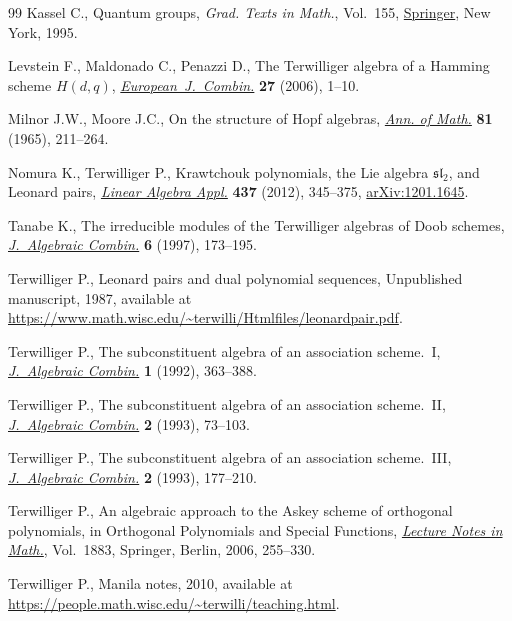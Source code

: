 \begin{thebibliography}{99}
Kassel C., Quantum groups, \textit{Grad. Texts in Math.}, Vol.~155, \href{https://doi.org/10.1007/978-1-4612-0783-2}{Springer},
 New York, 1995.

Levstein F., Maldonado C., Penazzi D., The {T}erwilliger algebra of a {H}amming
 scheme {$H(d,q)$}, \href{https://doi.org/10.1016/j.ejc.2004.08.005}{\textit{European~J.~Combin.}} \textbf{27} (2006), 1--10.

Milnor J.W., Moore J.C., On the structure of {H}opf algebras, \href{https://doi.org/10.2307/1970615}{\textit{Ann. of
 Math.}} \textbf{81} (1965), 211--264.

Nomura K., Terwilliger P., Krawtchouk polynomials, the {L}ie algebra
 {$\mathfrak{sl}_2$}, and {L}eonard pairs, \href{https://doi.org/10.1016/j.laa.2012.02.006}{\textit{Linear Algebra Appl.}}
 \textbf{437} (2012), 345--375, \href{https://arxiv.org/abs/1201.1645}{arXiv:1201.1645}.

Tanabe K., The irreducible modules of the {T}erwilliger algebras of {D}oob
 schemes, \href{https://doi.org/10.1023/A:1008647205853}{\textit{J.~Algebraic Combin.}} \textbf{6} (1997), 173--195.

Terwilliger P., Leonard pairs and dual polynomial sequences, {U}npublished
 manuscript, 1987, available at
 \url{https://www.math.wisc.edu/~terwilli/Htmlfiles/leonardpair.pdf}.

Terwilliger P., The subconstituent algebra of an association scheme.~{I},
 \href{https://doi.org/10.1023/A:1022494701663}{\textit{J.~Algebraic Combin.}} \textbf{1} (1992), 363--388.

Terwilliger P., The subconstituent algebra of an association scheme.~{II},
 \href{https://doi.org/10.1023/A:1022480715311}{\textit{J.~Algebraic Combin.}} \textbf{2} (1993), 73--103.

Terwilliger P., The subconstituent algebra of an association scheme.~{III},
 \href{https://doi.org/10.1023/A:1022415825656}{\textit{J.~Algebraic Combin.}} \textbf{2} (1993), 177--210.

Terwilliger P., An algebraic approach to the {A}skey scheme of orthogonal
 polynomials, in Orthogonal Polynomials and Special Functions, \href{https://doi.org/10.1007/978-3-540-36716-1_6}{\textit{Lecture
 Notes in Math.}}, Vol.~1883, Springer, Berlin, 2006, 255--330.

 Terwilliger P., Manila notes, 2010, available at \url{https://people.math.wisc.edu/~terwilli/teaching.html}.


\end{thebibliography}
